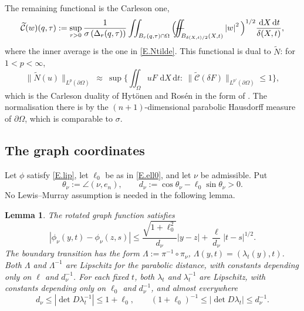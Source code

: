 \documentclass[12pt,leqno]{amsart}
\numberwithin{equation}{section}
\newcommand{\wt}{\widetilde}
\newcommand{\abs}[1]{\left\vert#1\right\vert}
\newcommand{\br}[1]{\left(#1\right)}
\newcommand{\om}{\Omega}
\newcommand{\pom}{\partial\Omega}
\newcommand{\Nt}{\widetilde N}
\renewcommand{\d}{\,\mathrm d}
\def\Yint#1{\mathchoice
	{\YYint\displaystyle\textstyle{#1}}%
	{\YYint\textstyle\scriptstyle{#1}}%
	{\YYint\scriptstyle\scriptscriptstyle{#1}}%
	{\YYint\scriptscriptstyle\scriptscriptstyle{#1}}%
	\!\dint}
\newcommand{\dint}{\int\!\!\!\!\!\int}
\def\YYint#1#2#3{{\setbox0=\hbox{$#1{#2#3}{\iint}$}
		\vcenter{\hbox{$#2#3$}}\kern-.51\wd0}}
\def\longdash{\mkern-1.5mu{-}\mkern-7.5mu{-}}
\def\fiint{\Yint\longdash}
\theoremstyle{plain}
\newtheorem{lemma}[equation]{Lemma}
\theoremstyle{remark}
\begin{document}
\noindent The remaining functional is the Carleson one,
\begin{equation}\label{E.carlfun}
  \wt{\mathcal C}(w)(q,\tau):=\sup_{r>0}\frac1{\sigma\br{\Delta_r(q,\tau)}}
  \iint_{B_r(q,\tau)\cap\om}
   \Big(\fiint_{B_{\delta(X,t)/2}(X,t)}\abs w^2\Big)^{1/2}
   \frac{\d X\d t}{\delta(X,t)} ,
\end{equation}
where the inner average is the one in \eqref{E.Ntilde}. This functional is
dual to $\Nt$: for
$1<p<\infty$,
\begin{equation}\label{E.carlduality}
  \big\|\Nt(u)\big\|_{L^p(\pom)}\ \approx\
  \sup\Big\{\iint_\om uF\,\d X\d t:\ \big\|\wt{\mathcal C}(\delta F)
   \big\|_{L^{p'}(\pom)}\le1\Big\} ,
\end{equation}
which is the Carleson duality of Hyt\"onen and Ros\'en \cite{HR} in the form of
\cite[Lemma 2.8]{DLP2}. The normalisation there is by the $(n+1)$-dimensional
parabolic Hausdorff measure of $\pom$, which is comparable to $\sigma$.

\subsection{The graph coordinates}\label{ss.graphgeometry}

Let $\phi$ satisfy \eqref{E.lip}, let $\ell_0$ be as in \eqref{E.ell0}, and
let $\nu$ be admissible. Put
\begin{equation}\label{E.transversality}
 \theta_\nu:=\angle(\nu,e_n),\qquad
 d_\nu:=\cos\theta_\nu-\ell_0\sin\theta_\nu>0.
\end{equation}
No Lewis--Murray assumption is needed in the following lemma.

\begin{lemma}\label{L.graphgeometry}
The rotated graph function satisfies
\begin{equation}\label{E.graphbound}
 |\phi_\nu(y,t)-\phi_\nu(z,s)|
 \le \frac{\sqrt{1+\ell_0^2}}{d_\nu}|y-z|
      +\frac{\ell}{d_\nu}|t-s|^{1/2}.
\end{equation}
The boundary transition has the form
$\Lambda:=\pi^{-1}\circ\pi_\nu$, $\Lambda(y,t)=(\lambda_t(y),t)$.
Both $\Lambda$ and $\Lambda^{-1}$ are Lipschitz for the parabolic distance,
with constants depending only on $\ell$ and $d_\nu^{-1}$. For each fixed $t$,
both $\lambda_t$ and $\lambda_t^{-1}$ are Lipschitz, with constants depending
only on $\ell_0$ and $d_\nu^{-1}$, and almost everywhere
\begin{equation}\label{E.graphjac}
 d_\nu\le |\det D\lambda_t^{-1}|\le1+\ell_0,\qquad
 (1+\ell_0)^{-1}\le |\det D\lambda_t|\le d_\nu^{-1}.
\end{equation}
\end{lemma}
\end{document}
